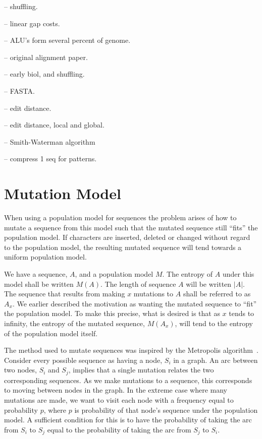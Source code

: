 \documentclass[letterpaper,11pt,oneside]{article}
\begin{document}
-- shuffling. \cite{fitch83}

-- linear gap costs. \cite{gotoh82}

\cite{grumbach94}

-- ALU's form several percent of genome.\cite{herzel94}

-- original alignment paper.\cite{levenshtein66}

\cite{loewenstern97}

-- early biol, and shuffling. \cite{needleman70}

-- FASTA. \cite{pearson88}

\cite{powell98b}

\cite{rivals97}

-- edit distance. \cite{sellers74}

-- edit distance, local and global. \cite{sellers80}

-- Smith-Waterman algorithm \cite{smith81}

-- compress 1 seq for patterns. \cite{stern01}

%




\appendix
\section{Mutation Model}
\label{sec:mutations}

When using a population model for sequences the problem arises of how to
mutate a sequence from this model such that the mutated sequence still
``fits'' the population model.  If characters are inserted, deleted or changed
without regard to the population model, the resulting mutated sequence will
tend towards a uniform population model.

We have a sequence, $A$, and a population model $M$.  The entropy of $A$ under
this model shall be written $M(A)$.  The length of sequence $A$ will be
written $|A|$.  The sequence that results from making $x$ mutations to $A$
shall be referred to as $A_x$.  We earlier described the motivation as wanting
the mutated sequence to ``fit'' the population model.  To make this precise,
what is desired is that as $x$ tends to infinity, the entropy of the mutated
sequence, $M(A_x)$, will tend to the entropy of the population model itself.

The method used to mutate sequences was inspired by the Metropolis
algorithm~\cite{metropolis53}.  Consider every possible sequence as having a
node, $S_i$ in a graph.  An arc between two nodes, $S_i$ and $S_j$, implies
that a single mutation relates the two corresponding sequences.  As we make
mutations to a sequence, this corresponds to moving between nodes in the
graph.  In the extreme case where many mutations are made, we want to visit
each node with a frequency equal to probability $p$, where $p$ is probability
of that node's sequence under the population model.  A sufficient condition
for this is to have the probability of taking the arc from $S_i$ to $S_j$
equal to the probability of taking the arc from $S_j$ to $S_i$.
\end{document}
